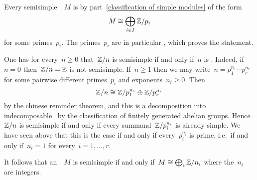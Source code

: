 Every semisimple~~$M$ is by part~\ref{classification of simple modules} of the form
\[
  M \cong \bigoplus_{i \in I} \mathbb{Z}/p_i
\]
for some primes~$p_i$.
The primes~$p_i$ are in particular , which proves the statement.


\begin{remark}
  One has for every~$n \geq 0$ that~$\mathbb{Z}/n$ is semisimple if and only if~$n$ is .
  Indeed, if~$n = 0$ then~$\mathbb{Z}/n = \mathbb{Z}$ is not semisimple.
  If~$n \geq 1$ then we may write~$n = p_1^{n_1} \dotsm p_r^{n_r}$ for some pairwise different primes~$p_i$ and exponents~$n_i \geq 0$.
  Then
  \[
          \mathbb{Z}/n
    \cong \mathbb{Z}/p_1^{n_1} \oplus \mathbb{Z}/p_r^{n_r}
  \]
  by the chinese reminder theorem, and this is a decomposition into indecomposable~{\modules{$\Integer$}} by the classification of finitely generated abelian groups.
  Hence~$\mathbb{Z}/n$ is semisimple if and only if every summand~$\mathbb{Z}/p_i^{n_i}$ is already simple.
  We have seen above that this is the case if and only if every~$p_i^{n_i}$ is prime, i.e.\ if and only if~$n_i = 1$ for every~$i = 1, \dotsc, r$.
  
  It follows that an~{\module{$\Integer$}}~$M$ is semisimple if and only if~$M \cong \bigoplus_i \mathbb{Z}/n_i$ where the~$n_i$ are  integers.
\end{remark}


